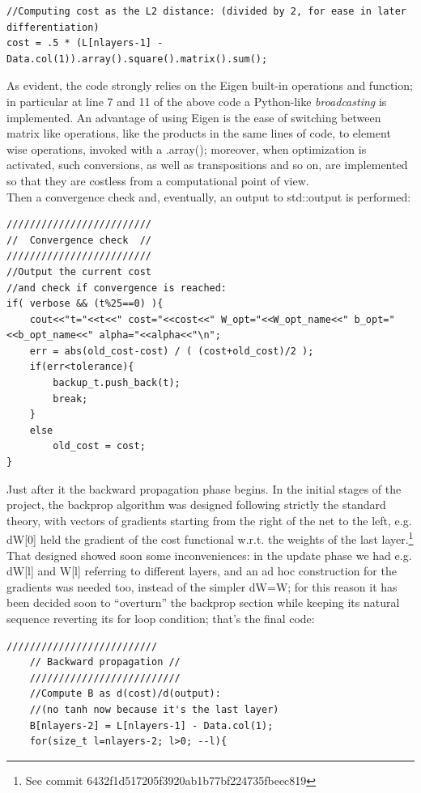 \documentclass[12pt, a4paper]{report}
\theoremstyle{definition}
\begin{document}
{\begin{lstlisting}[frame=single]
//Computing cost as the L2 distance: (divided by 2, for ease in later differentiation)
cost = .5 * (L[nlayers-1] - Data.col(1)).array().square().matrix().sum();
\end{lstlisting}
As evident, the code strongly relies on the Eigen built-in operations and function; in particular at line 7 and 11 of the above code a Python-like \textit{broadcasting} is implemented. An advantage of using Eigen is the ease of switching between matrix like operations, like the products in the same lines of code, to element wise operations, invoked with a {\ttfamily .array()}; moreover, when optimization is activated, such conversions, as well as transpositions and so on, are implemented so that they are costless from a computational point of view.\\
Then a convergence check and, eventually, an output to std::output is performed:
\begin{lstlisting}[frame=single, showstringspaces=false]
/////////////////////////
//  Convergence check  //
/////////////////////////
//Output the current cost
//and check if convergence is reached:
if( verbose && (t%25==0) ){
	cout<<"t="<<t<<" cost="<<cost<<" W_opt="<<W_opt_name<<" b_opt="<<b_opt_name<<" alpha="<<alpha<<"\n";
	err = abs(old_cost-cost) / ( (cost+old_cost)/2 );
	if(err<tolerance){
		backup_t.push_back(t);
		break;
	}
	else
		old_cost = cost;
}
\end{lstlisting}
Just after it the backward propagation phase begins. In the initial stages of the project, the backprop algorithm was designed following strictly the standard theory, with vectors of gradients starting from the right of the net to the left, e.g. {\ttfamily dW[0]} held the gradient of the cost functional w.r.t. the weights of the last layer.\footnote{See commit 6432f1d517205f3920ab1b77bf224735fbeec819} That designed showed soon some inconveniences: in the update phase we had e.g. {\ttfamily dW[l]} and {\ttfamily W[l]} referring to different layers, and an ad hoc construction for the gradients was needed too, instead of the simpler {\ttfamily dW=W}; for this reason it has been decided soon to ``overturn'' the backprop section while keeping its natural sequence reverting its for loop condition; that's the final code:
\begin{lstlisting}[frame=single]
	//////////////////////////
	// Backward propagation //
	//////////////////////////
	//Compute B as d(cost)/d(output): 
	//(no tanh now because it's the last layer)
	B[nlayers-2] = L[nlayers-1] - Data.col(1);	
	for(size_t l=nlayers-2; l>0; --l){

\end{lstlisting}}
\end{document}
